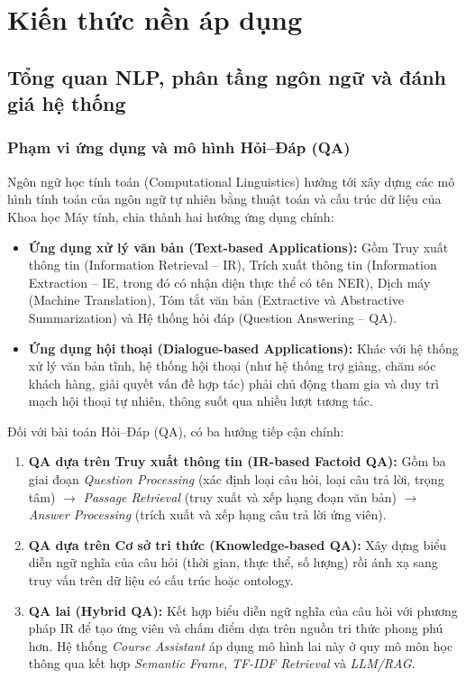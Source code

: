 \chapter{Kiến thức nền áp dụng}

\section{Tổng quan NLP, phân tầng ngôn ngữ và đánh giá hệ thống}

\subsection{Phạm vi ứng dụng và mô hình Hỏi--Đáp (QA)}

Ngôn ngữ học tính toán (Computational Linguistics) hướng tới xây dựng các mô hình tính toán của ngôn ngữ tự nhiên bằng thuật toán và cấu trúc dữ liệu của Khoa học Máy tính, chia thành hai hướng ứng dụng chính:
\begin{itemize}
  \item \textbf{Ứng dụng xử lý văn bản (Text-based Applications):} Gồm Truy xuất thông tin (Information Retrieval -- IR), Trích xuất thông tin (Information Extraction -- IE, trong đó có nhận diện thực thể có tên NER), Dịch máy (Machine Translation), Tóm tắt văn bản (Extractive và Abstractive Summarization) và Hệ thống hỏi đáp (Question Answering -- QA).
  \item \textbf{Ứng dụng hội thoại (Dialogue-based Applications):} Khác với hệ thống xử lý văn bản tĩnh, hệ thống hội thoại (như hệ thống trợ giảng, chăm sóc khách hàng, giải quyết vấn đề hợp tác) phải chủ động tham gia và duy trì mạch hội thoại tự nhiên, thông suốt qua nhiều lượt tương tác.
\end{itemize}

Đối với bài toán Hỏi--Đáp (QA), có ba hướng tiếp cận chính:
\begin{enumerate}
  \item \textbf{QA dựa trên Truy xuất thông tin (IR-based Factoid QA):} Gồm ba giai đoạn \emph{Question Processing} (xác định loại câu hỏi, loại câu trả lời, trọng tâm) $\rightarrow$ \emph{Passage Retrieval} (truy xuất và xếp hạng đoạn văn bản) $\rightarrow$ \emph{Answer Processing} (trích xuất và xếp hạng câu trả lời ứng viên).
  \item \textbf{QA dựa trên Cơ sở tri thức (Knowledge-based QA):} Xây dựng biểu diễn ngữ nghĩa của câu hỏi (thời gian, thực thể, số lượng) rồi ánh xạ sang truy vấn trên dữ liệu có cấu trúc hoặc ontology.
  \item \textbf{QA lai (Hybrid QA):} Kết hợp biểu diễn ngữ nghĩa của câu hỏi với phương pháp IR để tạo ứng viên và chấm điểm dựa trên nguồn tri thức phong phú hơn. Hệ thống \emph{Course Assistant} áp dụng mô hình lai này ở quy mô môn học thông qua kết hợp \emph{Semantic Frame}, \emph{TF-IDF Retrieval} và \emph{LLM/RAG}.
\end{enumerate}

